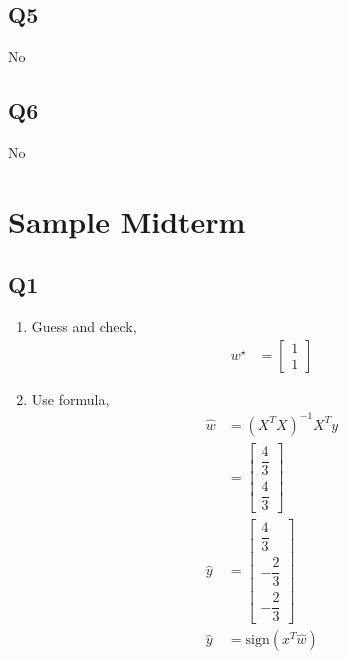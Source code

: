 \documentclass{article}
\begin{document}
\subsection{Q5}
No



\subsection{Q6}
No






\section{Sample Midterm} 


\subsection{Q1}
\begin{enumerate}
\item Guess and check,
\begin{align*}
w^\star  &= \begin{bmatrix} 1 \\ 1 \end{bmatrix}
\end{align*}
\item Use formula,
\begin{align*}
\hat{w} &= \left(X^{T} X\right)^{-1} X^{T} y 
\\ &= \begin{bmatrix} \dfrac{4}{3} \\ \dfrac{4}{3} \end{bmatrix}
\\ \hat{y} &= \begin{bmatrix} \dfrac{4}{3} \\ - \dfrac{2}{3} \\ - \dfrac{2}{3} \end{bmatrix}
\\ \hat{y} &= \text{sign}\left(x^{T} \hat{w}\right)
\end{align*}
\end{enumerate}
\end{document}
